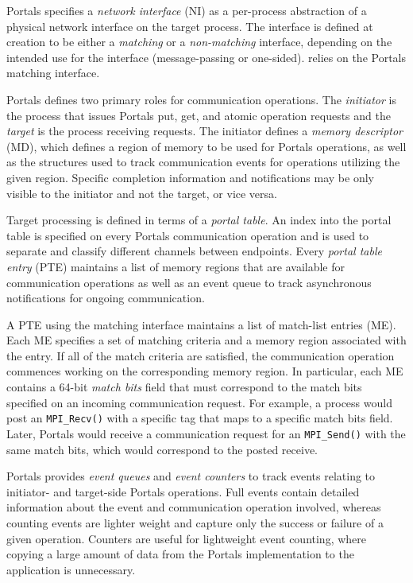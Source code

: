 Portals specifies a {\em network interface} (NI) as a per-process
abstraction of a physical network interface on the target process. The
interface is defined at creation to be either a {\em matching}
or a {\em non-matching} interface, depending on the intended use for
the interface (message-passing or one-sided). \pdht relies on the
Portals matching interface.

Portals defines two primary roles for communication operations. The
{\em initiator} is the process that issues Portals put, get, and atomic operation
requests and the {\em target} is the process receiving
requests. The initiator defines a {\em memory descriptor} (MD), which defines a
region of memory to be used for Portals operations, as well as the
structures used to track communication events for operations utilizing the
given region.  Specific completion information
and notifications may be only visible to the initiator and not the
target, or vice versa.

Target processing is defined in terms of a {\em portal table}. An index into the
portal table is specified on every Portals communication operation and
is used to separate and classify different channels between endpoints.
Every {\em portal table entry} (PTE) maintains a list of memory regions that
are available for communication operations as well as an event queue
to track asynchronous notifications for ongoing communication.

A PTE using the matching interface maintains a list of match-list
entries (ME). Each ME specifies a set of matching criteria and a
memory region associated with the entry. If all of the match criteria
are satisfied, the communication operation commences working on the
corresponding memory region. In particular, each ME contains a 64-bit
{\em match bits} field that must correspond to the match bits
specified on an incoming communication request. For example, a process
would post an {\tt MPI\_Recv()} with a specific tag that maps to a
specific match bits field. Later, Portals would receive a
communication request for an {\tt MPI\_Send()} with the same match
bits, which would correspond to the posted receive.

Portals provides {\em event queues} and {\em event counters} to track
events relating to initiator- and target-side Portals operations.
Full events contain detailed information about the event and
communication operation involved, whereas counting events are lighter
weight and capture only the success or failure of a given operation.
Counters are useful for lightweight event counting, where copying a
large amount of data from the Portals implementation to the
application is unnecessary.

